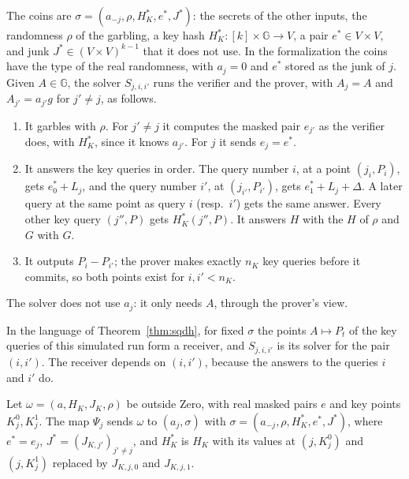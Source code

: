 \begin{definition}
  \label{def:co-solver}
  \leanok
  The coins are $\sigma = (a_{-j}, \rho, H_K^*, e^*, J^*)$: the secrets of the other inputs, the
  randomness $\rho$ of the garbling, a key hash $H_K^* : [k] \times \mathbb{G} \to V$, a pair $e^* \in V
  \times V$, and junk $J^* \in (V \times V)^{k - 1}$ that it does not use. In the formalization
  the coins have the type of the real randomness, with $a_j = 0$ and $e^*$ stored as the junk of
  $j$. Given $A \in \mathbb{G}$, the
  solver $S_{j,i,i'}$ runs the verifier and the prover, with $A_j = A$ and $A_{j'} = a_{j'} g$ for
  $j' \neq j$, as follows.
  \begin{enumerate}
    \item It garbles with $\rho$. For $j' \neq j$ it computes the masked pair $e_{j'}$ as the
    verifier does, with $H_K^*$, since it knows $a_{j'}$. For $j$ it sends $e_j = e^*$.
    \item It answers the key queries in order. The query number $i$, at a point $(j_i, P_i)$, gets
    $e^*_0 + L_j$, and the query number $i'$, at $(j_{i'}, P_{i'})$, gets $e^*_1 + L_j + \Delta$. A
    later query at the same point as query $i$ (resp.\ $i'$) gets the same answer. Every other key
    query $(j'', P)$ gets $H_K^*(j'', P)$. It answers $H$ with the $H$ of $\rho$ and $G$ with $G$.
    \item It outputs $P_i - P_{i'}$; the prover makes exactly $n_K$ key queries before it commits,
    so both points exist for $i, i' < n_K$.
  \end{enumerate}
  The solver does not use $a_j$: it only needs $A$, through the prover's view.
\end{definition}

In the language of Theorem~\ref{thm:sqdh}, for fixed $\sigma$ the points $A \mapsto P_t$ of the
key queries of this simulated run form a receiver, and $S_{j,i,i'}$ is its solver for the pair
$(i, i')$. The receiver depends on $(i, i')$, because the answers to the queries $i$ and $i'$ do.

\begin{definition}
  \label{def:co-solver-map}
  \leanok
  Let $\omega = (a, H_K, J_K, \rho)$ be outside $\mathrm{Zero}$, with real masked pairs $e$ and key
  points $K^0_j, K^1_j$. The map $\Psi_j$ sends $\omega$ to $(a_j, \sigma)$ with $\sigma = (a_{-j},
  \rho, H_K^*, e^*, J^*)$, where $e^* = e_j$, $J^* = (J_{K, j'})_{j' \neq j}$, and $H_K^*$ is $H_K$
  with its values at $(j, K^0_j)$ and $(j, K^1_j)$ replaced by $J_{K,j,0}$ and $J_{K,j,1}$.
\end{definition}

